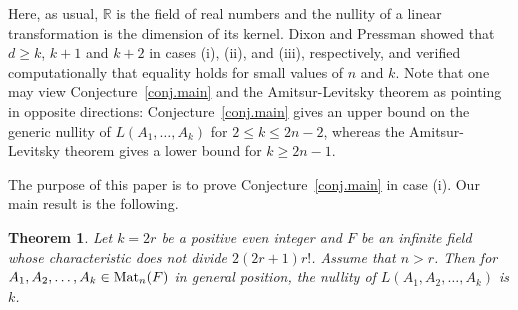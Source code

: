 \documentclass{amsproc}
\newtheorem{theorem}{Theorem}[section]
\theoremstyle{definition}
\theoremstyle{remark}
\numberwithin{equation}{section}
\newcommand{\R}{{\mathbb R}}
\newcommand{\M}{{\rm Mat}}
\begin{document}
Here, as usual, $\R$ is the field of real numbers and the nullity of a linear transformation is the dimension of its kernel.
Dixon and Pressman showed that $d \geqslant k$, $k+1$ and $k+2$ in cases (i), (ii), and (iii), respectively, and verified computationally
that equality holds for small values of $n$ and $k$. 
Note that one may view Conjecture~\ref{conj.main} and the Amitsur-Levitsky theorem as pointing in opposite directions:
Conjecture~\ref{conj.main} gives an upper bound on the generic nullity of $L(A_1, \ldots, A_k)$ for $2 \leqslant k \leqslant 2n-2$, 
whereas the Amitsur-Levitsky theorem gives a lower bound for $k \geqslant 2n -1$. 

The purpose of this paper is to prove Conjecture~\ref{conj.main} in case (i). Our main result is the following.

\begin{theorem}\label{main_thm}
Let $k = 2r$ be a positive even integer and $F$ be an infinite field whose characteristic does not divide $2(2r+1)r!$. Assume that $n > r$. Then for $A_1,A_2,\dots,A_k\in \M_n(F)$ in general position, the nullity of $L(A_1,A_2,\dots,A_k)$ is $k$.
\end{theorem}
\end{document}
